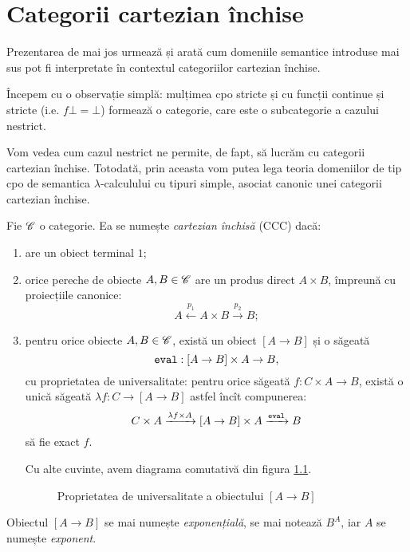 \chapter{Categorii cartezian închise}
\label{sec:ccc}

\indent\indent Prezentarea de mai jos urmează \cite{bw} și arată cum domeniile semantice
introduse mai sus pot fi interpretate în contextul categoriilor cartezian
închise.

Începem cu o observație simplă: mulțimea cpo stricte și cu funcții continue
și stricte (i.e. $ f\bot = \bot $) formează o categorie, care este o subcategorie
a cazului nestrict.

Vom vedea cum cazul nestrict ne permite, de fapt, să lucrăm cu categorii
cartezian închise. Totodată, prin aceasta vom putea lega teoria domeniilor
de tip cpo de semantica $ \lambda $-calculului cu tipuri simple, asociat
canonic unei categorii cartezian închise.

\begin{definition}\label{def:ccc}
  Fie $ \mathscr{C} $ o categorie. Ea se numește \emph{cartezian închisă} (CCC)
  dacă:
  \begin{enumerate}[(CCC1)]
  \item are un obiect terminal $ 1 $;
  \item orice pereche de obiecte $ A, B \in \mathscr{C} $ are un produs direct
    $ A \times B $, împreună cu proiecțiile canonice:
    \[
      A \xleftarrow{p_1} A \times B \xrightarrow{p_2} B;
    \]
  \item pentru orice obiecte $ A, B \in \mathscr{C} $, există un obiect
    $ [A \to B] $ și o săgeată
    \[
      \texttt{eval} : [A \to B] \times A \to B,
    \]
    cu proprietatea de universalitate: pentru orice săgeată $ f : C \times A \to B $,
    există o unică săgeată $ \lambda f : C \to [A \to B] $ astfel încît
    compunerea:
    \[
      C \times A \xrightarrow{\lambda f \times A} [A \to B] \times A \xrightarrow{\texttt{eval}} B
    \]
    să fie exact $ f $.

    Cu alte cuvinte, avem diagrama comutativă din figura \ref{fig:ccc}.
    \begin{figure}[!htbp]
      \centerline{
        \xymatrixcolsep{50px}
        \xymatrixrowsep{50px}
      }
      \caption{Proprietatea de universalitate a obiectului $ [A \to B] $}
      \label{fig:ccc}
    \end{figure}
  \end{enumerate}

  Obiectul $ [A \to B] $ se mai numește \emph{exponențială}, se mai notează $ B^A $,
  iar $ A $ se numește \emph{exponent}.
\end{definition}

